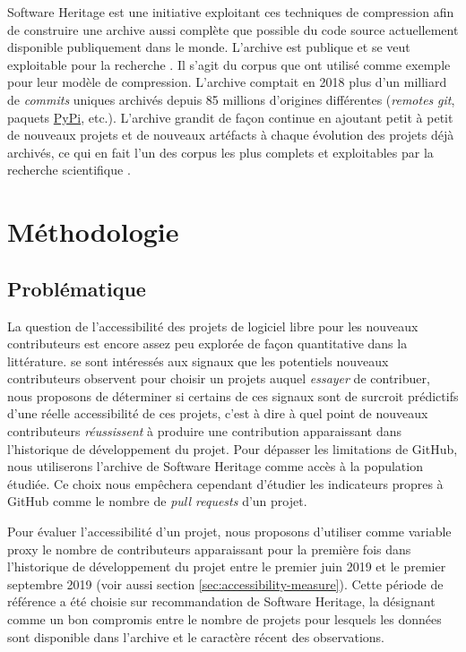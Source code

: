 \documentclass[dvipsnames,runningheads]{llncs}
\newcommand{\en}[1]{\foreignlanguage{english}{\emph{#1}}}
\begin{document}
    Software Heritage est une initiative exploitant ces techniques de compression afin de construire une
    archive aussi complète que possible du code source actuellement disponible publiquement dans le monde.
    L'archive est publique et se veut exploitable pour la recherche \parencite{swh-2017}. Il s'agit du corpus
    que \textcite{swh-graph-2020} ont utilisé comme exemple pour leur modèle de compression. L'archive
    comptait en 2018 plus d'un milliard de \en{commits} uniques archivés depuis 85 millions d'origines
    différentes (\en{remotes} \en{git}, paquets \href{https://pypi.org/}{PyPi}, etc.). L'archive grandit de
    façon continue en ajoutant petit à petit de nouveaux projets et de nouveaux artéfacts à chaque évolution
    des projets déjà archivés, ce qui en fait l'un des corpus les plus complets et exploitables par la
    recherche scientifique \parencite{swh-2019,swh-growth-2019}.

    \section{Méthodologie}

    \subsection{Problématique}

    La question de l'accessibilité des projets de logiciel libre pour les nouveaux contributeurs est encore
    assez peu explorée de façon quantitative dans la littérature. \textcite{signals-2019} se sont intéressés
    aux signaux que les potentiels nouveaux contributeurs observent pour choisir un projets auquel
    \emph{essayer} de contribuer, nous proposons de déterminer si certains de ces signaux sont de surcroit
    prédictifs d'une réelle accessibilité de ces projets, c'est à dire à quel point de nouveaux contributeurs
    \emph{réussissent} à produire une contribution apparaissant dans l'historique de développement du projet.
    Pour dépasser les limitations de GitHub, nous utiliserons l'archive de Software Heritage comme accès à la
    population étudiée. Ce choix nous empêchera cependant d'étudier les indicateurs propres à GitHub comme le
    nombre de \en{pull requests} d'un projet.

    Pour évaluer l'accessibilité d'un projet, nous proposons d'utiliser comme variable proxy le nombre de
    contributeurs apparaissant pour la première fois dans l'historique de développement du projet entre le
    premier juin 2019 et le premier septembre 2019 \parencite{signals-2019} (voir aussi section
    \ref{sec:accessibility-measure}). Cette période de référence a été choisie sur recommandation
    de Software Heritage, la désignant comme un bon compromis entre le nombre de projets pour lesquels les
    données sont disponible dans l'archive et le caractère récent des observations.
\end{document}
